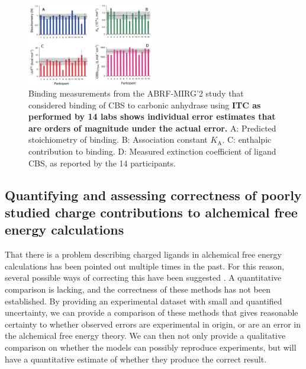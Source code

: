 \documentclass[10pt,final]{article}
\begin{document}
\begin{figure}[H]
	\centering
	\includegraphics[width=0.49\textwidth]{figures/cbs_ca_II.PNG}
	\caption{Binding measurements from the ABRF-MIRG'2 study that considered binding of CBS to carbonic anhydrase using \textbf{ITC as performed by 14 labs shows individual error estimates that are orders of magnitude under the actual error.} A: Predicted stoichiometry of binding. B: Association constant $K_\mathrm{A}$. C: enthalpic contribution to binding. D: Measured extinction coefficient of ligand CBS, as reported by the 14 participants.\cite{Myszka2003a}}
	\label{figure:abrf-mirg2}
\end{figure}

\subsection*{Quantifying and assessing correctness of poorly studied charge contributions to alchemical free energy calculations}
That there is a problem describing charged ligands in alchemical free energy calculations has been pointed out multiple times in the past\cite{Rocklin2013b,Muddana2014a}. 
For this reason, several possible ways of correcting this have been suggested \cite{Reif2013a,Rocklin2013a}. A quantitative comparison is lacking, and the correctness of these methods has not been established. 
By providing an experimental dataset with small and quantified uncertainty, we can provide a comparison of these methods that gives reasonable certainty to whether observed errors are experimental in origin, or are an error in the alchemical free energy theory. 
We can then not only provide a qualitative comparison on whether the models can possibly reproduce experiments, but will have a quantitative estimate of whether they produce the correct result.
\end{document}
